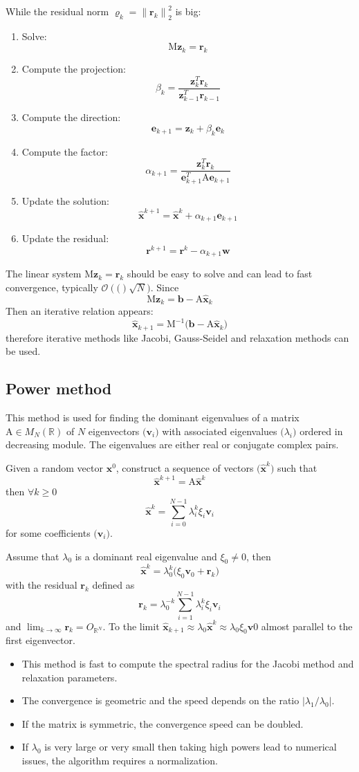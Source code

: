 \documentclass{article}
\newcommand{\xR}{\mathbb{R}}
\newcommand{\xRN}{{\xR^N}}
\newcommand{\xMNR}{{M_N(\xR)}}
\newcommand{\bb}{{\boldsymbol b}}
\newcommand{\ee}{{\boldsymbol e}}
\newcommand{\rr}{{\boldsymbol r}}
\newcommand{\xx}{{\boldsymbol x}}
\newcommand{\hx}{\hat{\boldsymbol x}}
\newcommand{\vv}{{\boldsymbol v}}
\newcommand{\ww}{{\boldsymbol w}}
\newcommand{\zz}{{\boldsymbol z}}
\newcommand{\mA}{{\mathrm A}}
\newcommand{\mM}{{\mathrm M}}
\newcommand{\Seq}[1]{\bigl(#1\bigr)}
\newcommand{\Order}[1]{\mathcal{O}\left(#1\right)}
\newcommand{\norm}[1]{{\lVert #1 \rVert}}
\begin{document}
\medskip
While the residual norm $\varrho_k = \norm{\rr_k}^2_2$ is big:
\begin{enumerate}

\item Solve:
\[
\mM\zz_{k} = \rr_k
\]
\item Compute the projection:
\[
\beta_k = \frac{\zz_{k}^T\rr_k}{\zz_{k-1}^T\rr_{k-1}}
\]
\item Compute the direction:
\[
\ee_{k+1} = \zz_k + \beta_k\ee_k
\]
\item Compute the factor:
\[
\alpha_{k+1} = \frac{\zz_{k}^T\rr_k}{\ee^T_{k+1}\mA\ee_{k+1}}
\]
\item Update the solution:
\[
\hx^{k+1} = \hx^k + \alpha_{k+1} \ee_{k+1}
\]
\item Update the residual:
\[
\rr^{k+1} = \rr^k - \alpha_{k+1} \ww
\]
\end{enumerate}

\medskip
The linear system $\mM\zz_{k} = \rr_k$ should be easy to solve and can lead to fast convergence, typically $\Order(\sqrt{N})$.
Since
\[
\mM\zz_{k} = \bb - \mA\hx_k
\]
Then an iterative relation appears:
\[
\hx_{k+1} = \mM^{-1}\bigl(\bb - \mA\hx_k\bigr)
\]
therefore iterative methods like Jacobi, Gauss-Seidel and relaxation methods can be used.

\subsection{Power method}

This method is used for finding the dominant eigenvalues of a matrix $\mA \in \xMNR$ of $N$ eigenvectors $\Seq{\vv_i}$ with associated eigenvalues $\Seq{\lambda_i}$ ordered in decreasing module.
The eigenvalues are either real or conjugate complex pairs.

\medskip
Given a random vector $\xx^0$, construct a sequence of vectors $\Seq{\hx^k}$ such that
\[
\hx^{k+1} = \mA \hx^k
\]
then $\forall k \geq 0$
\[
\hx^k = \sum_{i=0}^{N-1} \lambda_i^k \xi_i \vv_i
\]
for some coefficients $\Seq{\vv_i}$.

\medskip
Assume that $\lambda_0$ is a dominant real eigenvalue and $\xi_0 \neq 0$, then
\[
\hx^k = \lambda_0^k \bigl(\xi_0 \vv_0 + \rr_k \bigr)
\]
with the residual $\rr_k$ defined as
\[
\rr_k = \lambda_0^{-k} \sum_{i=1}^{N-1} \lambda_i^k \xi_i \vv_i
\]
and $\lim_{k\rightarrow\infty} \rr_k = O_{\xRN}$.
To the limit $\hx_{k+1} \approx \lambda_0 \hx^k \approx \lambda_0\xi_0\vv0$ almost parallel to the first eigenvector.

\medskip
\begin{itemize}
\item This method is fast to compute the spectral radius for the Jacobi method and relaxation parameters.
\item The convergence is geometric and the speed depends on the ratio $\lvert \lambda_1 / \lambda_0\rvert$.
\item If the matrix is symmetric, the convergence speed can be doubled.
\item If $\lambda_0$ is very large or very small then taking high powers lead to numerical issues, the algorithm requires a normalization.
\end{itemize}
\end{document}
